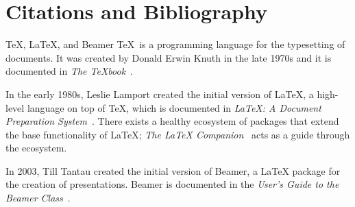 \section{Citations and Bibliography}

\begin{frame}{\TeX, \LaTeX, and Beamer} \justifying
\TeX\ is a programming language for the typesetting of documents. It was created by Donald Erwin Knuth in the late 1970s and it is documented in \emph{The \TeX book}~\cite{knuth1984texbook}.

\bigskip

In the early 1980s, Leslie Lamport created the initial version of \LaTeX, a high-level language on top of \TeX, which is documented in \emph{\LaTeX{}: A Document Preparation System}~\cite{lamport1994latex}. There exists a healthy ecosystem of packages that extend the base functionality of \LaTeX; \emph{The \LaTeX{} Companion}~\cite{mittelbach2004latex} acts as a guide through the ecosystem.

\bigskip

In 2003, Till Tantau created the initial version of Beamer, a \LaTeX{} package for the creation of presentations. Beamer is documented in the \emph{User's Guide to the Beamer Class}~\cite{tantau2004user}.
\end{frame}
